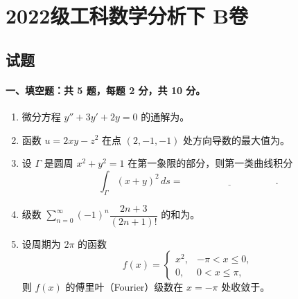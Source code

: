\section{2022级工科数学分析下 B卷}

\subsection{试题}

\paragraph*{一、填空题：共 5 题，每题 2 分，共 10 分。}
\begin{enumerate}
  \item 微分方程 $y''+3y'+2y=0$ 的通解为\underline{\hspace{4cm}}。
  \item 函数 $u=2xy-z^2$ 在点 $(2,-1,-1)$ 处方向导数的最大值为\underline{\hspace{4cm}}。
  \item 设 $\Gamma$ 是圆周 $x^2+y^2=1$ 在第一象限的部分，则第一类曲线积分
  \[
    \int_\Gamma (x+y)^2\,ds=\underline{\hspace{4cm}}.
  \]
  \item 级数 $\displaystyle \sum_{n=0}^{\infty}(-1)^n\dfrac{2n+3}{(2n+1)!}$ 的和为\underline{\hspace{4cm}}。
  \item 设周期为 $2\pi$ 的函数
  \[
    f(x)=
    \begin{cases}
      x^2, & -\pi<x\le 0,\\
      0, & 0<x\le \pi,
    \end{cases}
  \]
  则 $f(x)$ 的傅里叶（Fourier）级数在 $x=-\pi$ 处收敛于\underline{\hspace{4cm}}。
\end{enumerate}


